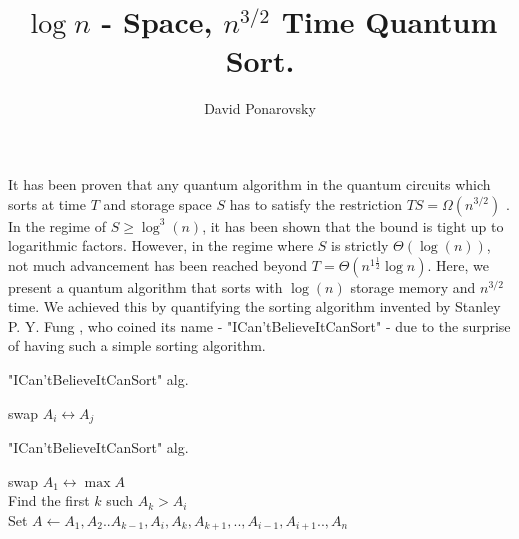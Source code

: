 \documentclass[manuscript,screen,review]{acmart}
\begin{document}


\title{$\log n$ - Space, $n^{3/2}$ Time Quantum Sort.} 
\author{David Ponarovsky}
\maketitle

It has been proven that any quantum algorithm in the quantum circuits which sorts at time $T$ and storage space $S$ has to satisfy the restriction $TS = \Omega(n^{3/2})$ \cite{klauck2003quantum}. In the regime of $S \ge \log^{3}(n)$, it has been shown that the bound is tight up to logarithmic factors. However, in the regime where $S$ is strictly $\Theta(\log(n))$, not much advancement has been reached beyond $T = \Theta\left( n^{1 \frac{1}{2}} \log n \right)$. Here, we present a quantum algorithm that sorts with $\log(n)$ storage memory and $n^{3/2}$ time. We achieved this by quantifying the sorting algorithm invented by Stanley P. Y. Fung \cite{Simplesort}, who coined its name - "ICan'tBelieveItCanSort" - due to the surprise of having such a simple sorting algorithm.

\begin{algorithm}
\SetAlgoLined
{}
\caption{ "ICan'tBelieveItCanSort"  alg.}
 {
   {
     {
      swap $A_{i} \leftrightarrow A_{j}$
    }
  }
}
\end{algorithm}
\begin{algorithm}

\SetAlgoLined
{}
\caption{ "ICan'tBelieveItCanSort"  alg.}
swap $A_{1} \leftrightarrow \max A$ \\
 {
    Find the first $k$ such $A_{k} > A_{i}$ \\
    Set $A \leftarrow A_{1},A_{2}..A_{k-1},A_{i},A_{k},A_{k+1},..,A_{i-1},A_{i+1}..,A_{n}$
}
\end{algorithm}
\end{document}
